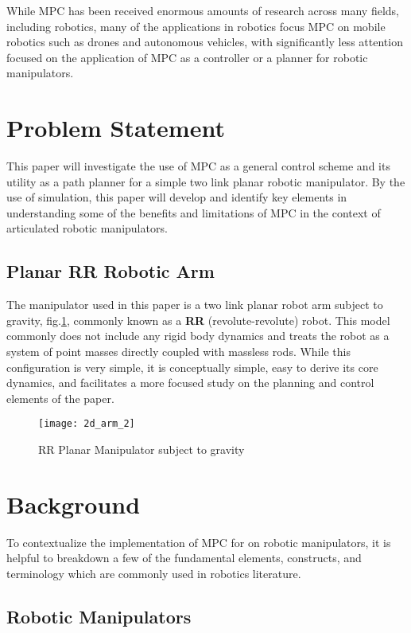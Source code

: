 \documentclass[journal]{IEEEtran}
\begin{document}
While MPC has been received enormous amounts of research across many fields, including  robotics, many of the applications in robotics focus MPC on mobile robotics such as drones and autonomous vehicles, with significantly less attention focused on the application of MPC as a controller or a planner for robotic manipulators.

\section{Problem Statement}

This paper will investigate the use of MPC as a general control scheme and its utility as a path planner for a simple two link planar robotic manipulator. By the use of simulation, this paper will develop and identify key elements in understanding some of the benefits and limitations of MPC in the context of articulated robotic manipulators.

\subsection{Planar RR Robotic Arm}

The manipulator used in this paper is a two link planar robot arm subject to gravity, fig.\ref{RRrobot}, commonly known as a \textbf{RR} (revolute-revolute) robot. This model commonly does not include any rigid body dynamics and treats the robot as a system of point masses directly coupled with massless rods. While this configuration is very simple, it is conceptually simple, easy to derive its core dynamics, and facilitates a more focused study on the planning and control elements of the paper. \\

\begin{figure}
    \centering
    \texttt{[image: 2d\_arm\_2]}
    \caption{RR Planar Manipulator subject to gravity}
    \label{RRrobot}
\end{figure}

\section{Background}

To contextualize the implementation of MPC for on robotic manipulators, it is helpful to breakdown a few of the fundamental elements, constructs, and terminology which are commonly used in robotics literature.

\subsection{Robotic Manipulators}
\end{document}
